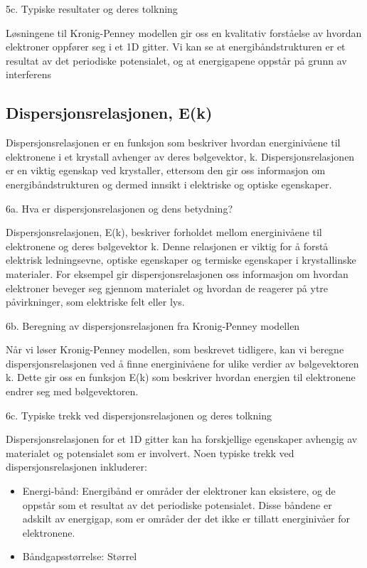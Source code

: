 5c. Typiske resultater og deres tolkning

Løsningene til Kronig-Penney modellen gir oss en kvalitativ forståelse av hvordan elektroner oppfører seg i et 1D gitter. Vi kan se at energibåndstrukturen er et resultat av det periodiske potensialet, og at energigapene oppstår på grunn av interferens

\subsection*{Dispersjonsrelasjonen, E(k)}
Dispersjonsrelasjonen er en funksjon som beskriver hvordan energinivåene til elektronene i et krystall avhenger av deres bølgevektor, k. Dispersjonsrelasjonen er en viktig egenskap ved krystaller, ettersom den gir oss informasjon om energibåndstrukturen og dermed innsikt i elektriske og optiske egenskaper.

6a. Hva er dispersjonsrelasjonen og dens betydning?

Dispersjonsrelasjonen, E(k), beskriver forholdet mellom energinivåene til elektronene og deres bølgevektor k. Denne relasjonen er viktig for å forstå elektrisk ledningsevne, optiske egenskaper og termiske egenskaper i krystallinske materialer. For eksempel gir dispersjonsrelasjonen oss informasjon om hvordan elektroner beveger seg gjennom materialet og hvordan de reagerer på ytre påvirkninger, som elektriske felt eller lys.

6b. Beregning av dispersjonsrelasjonen fra Kronig-Penney modellen

Når vi løser Kronig-Penney modellen, som beskrevet tidligere, kan vi beregne dispersjonsrelasjonen ved å finne energinivåene for ulike verdier av bølgevektoren k. Dette gir oss en funksjon E(k) som beskriver hvordan energien til elektronene endrer seg med bølgevektoren.

6c. Typiske trekk ved dispersjonsrelasjonen og deres tolkning

Dispersjonsrelasjonen for et 1D gitter kan ha forskjellige egenskaper avhengig av materialet og potensialet som er involvert. Noen typiske trekk ved dispersjonsrelasjonen inkluderer:
\begin{itemize}
    \item Energi-bånd: Energibånd er områder der elektroner kan eksistere, og de oppstår som et resultat av det periodiske potensialet. Disse båndene er adskilt av energigap, som er områder der det ikke er tillatt energinivåer for elektronene.
    \item Båndgapsstørrelse: Størrel
\end{itemize}

